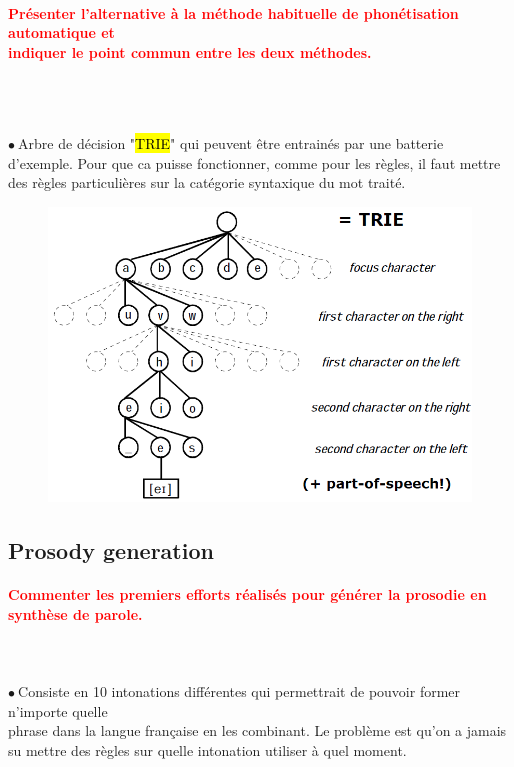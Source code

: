 \documentclass[letterpaper, 12pt]{article}
\newcommand{\alinea}{
\hspace*{0.3cm}}
\newcommand{\red}[1]{
	\textcolor{red}{#1}
}
\newcommand{\point}{$\bullet\ $}
\begin{document}
    	\paragraph{\red{Présenter l'alternative à la méthode habituelle de phonétisation automatique et 
    	~\\ \hspace*{0.035cm} indiquer le point commun entre les deux méthodes.}}~\\~\\
			\begin{minipage}{0.4\textwidth}
				\point Arbre de décision "\hl{TRIE}" qui peuvent être entrainés par une batterie d'exemple.
					Pour que ca puisse fonctionner, comme pour les règles, il faut mettre des règles particulières
					sur la catégorie syntaxique du mot traité.
			\end{minipage}\hfill
			\begin{minipage}{0.55\textwidth}
				\begin{figure}[H]
					\centering
					\includegraphics[scale=0.5]{Images/trie}
				\end{figure}\noindent
			\end{minipage}
	\subsection{Prosody generation}
		\paragraph{\red{Commenter les premiers efforts réalisés pour générer la prosodie en synthèse de parole.}}
		~\\~\\
			\point Consiste en 10 intonations différentes qui permettrait de pouvoir former n'importe quelle
				\\\alinea phrase dans la langue française en les combinant. Le problème est qu'on a jamais
				\\\alinea su mettre des règles sur quelle intonation utiliser à quel moment.
\end{document}
